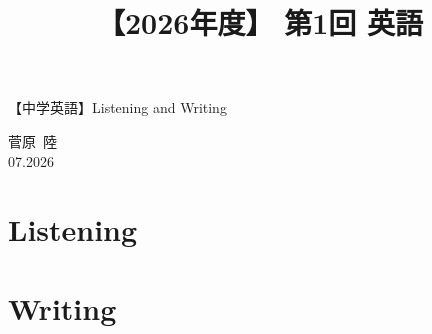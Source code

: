 \documentclass[12pt,a4paper]{jsarticle}
\title{【2026年度】 第1回 英語}                %
\author{}                     %
\date{}                       %
\begin{document}
\begin{center}
{\LARGE 【中学英語】Listening and Writing}
\end{center}

\vspace{5mm}
\begin{flushright}
  菅原\ 陸\\[1.2em]
  07.2026
\end{flushright}


\section{Listening}



\section{Writing}


\end{document}
